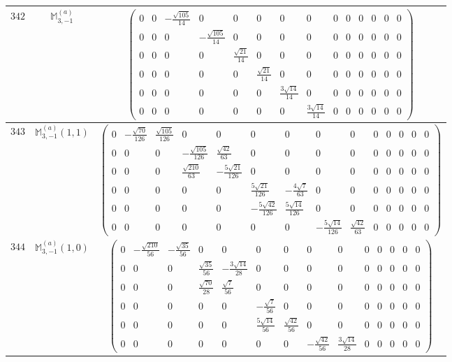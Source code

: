 \documentclass[fleqn,8pt,landscape]{jsarticle}
\begin{document}
\begin{center}
\begin{longtable}{ccc}
$ 342 $ & $ \mathbb{M}_{3,-1}^{(a)} $ & $ \begin{pmatrix} 0 & 0 & - \frac{\sqrt{105}}{14} & 0 & 0 & 0 & 0 & 0 & 0 & 0 & 0 & 0 & 0 & 0 \\ 0 & 0 & 0 & - \frac{\sqrt{105}}{14} & 0 & 0 & 0 & 0 & 0 & 0 & 0 & 0 & 0 & 0 \\ 0 & 0 & 0 & 0 & \frac{\sqrt{21}}{14} & 0 & 0 & 0 & 0 & 0 & 0 & 0 & 0 & 0 \\ 0 & 0 & 0 & 0 & 0 & \frac{\sqrt{21}}{14} & 0 & 0 & 0 & 0 & 0 & 0 & 0 & 0 \\ 0 & 0 & 0 & 0 & 0 & 0 & \frac{3 \sqrt{14}}{14} & 0 & 0 & 0 & 0 & 0 & 0 & 0 \\ 0 & 0 & 0 & 0 & 0 & 0 & 0 & \frac{3 \sqrt{14}}{14} & 0 & 0 & 0 & 0 & 0 & 0 \end{pmatrix} $ \\ \hline
$ 343 $ & $ \mathbb{M}_{3,-1}^{(a)}(1,1) $ & $ \begin{pmatrix} 0 & - \frac{\sqrt{70}}{126} & \frac{\sqrt{105}}{126} & 0 & 0 & 0 & 0 & 0 & 0 & 0 & 0 & 0 & 0 & 0 \\ 0 & 0 & 0 & - \frac{\sqrt{105}}{126} & \frac{\sqrt{42}}{63} & 0 & 0 & 0 & 0 & 0 & 0 & 0 & 0 & 0 \\ 0 & 0 & 0 & \frac{\sqrt{210}}{63} & - \frac{5 \sqrt{21}}{126} & 0 & 0 & 0 & 0 & 0 & 0 & 0 & 0 & 0 \\ 0 & 0 & 0 & 0 & 0 & \frac{5 \sqrt{21}}{126} & - \frac{4 \sqrt{7}}{63} & 0 & 0 & 0 & 0 & 0 & 0 & 0 \\ 0 & 0 & 0 & 0 & 0 & - \frac{5 \sqrt{42}}{126} & \frac{5 \sqrt{14}}{126} & 0 & 0 & 0 & 0 & 0 & 0 & 0 \\ 0 & 0 & 0 & 0 & 0 & 0 & 0 & - \frac{5 \sqrt{14}}{126} & \frac{\sqrt{42}}{63} & 0 & 0 & 0 & 0 & 0 \end{pmatrix} $ \\ \hline
$ 344 $ & $ \mathbb{M}_{3,-1}^{(a)}(1,0) $ & $ \begin{pmatrix} 0 & - \frac{\sqrt{210}}{56} & - \frac{\sqrt{35}}{56} & 0 & 0 & 0 & 0 & 0 & 0 & 0 & 0 & 0 & 0 & 0 \\ 0 & 0 & 0 & \frac{\sqrt{35}}{56} & - \frac{3 \sqrt{14}}{28} & 0 & 0 & 0 & 0 & 0 & 0 & 0 & 0 & 0 \\ 0 & 0 & 0 & \frac{\sqrt{70}}{28} & \frac{\sqrt{7}}{56} & 0 & 0 & 0 & 0 & 0 & 0 & 0 & 0 & 0 \\ 0 & 0 & 0 & 0 & 0 & - \frac{\sqrt{7}}{56} & 0 & 0 & 0 & 0 & 0 & 0 & 0 & 0 \\ 0 & 0 & 0 & 0 & 0 & \frac{5 \sqrt{14}}{56} & \frac{\sqrt{42}}{56} & 0 & 0 & 0 & 0 & 0 & 0 & 0 \\ 0 & 0 & 0 & 0 & 0 & 0 & 0 & - \frac{\sqrt{42}}{56} & \frac{3 \sqrt{14}}{28} & 0 & 0 & 0 & 0 & 0 \end{pmatrix} $ \\ \hline

\end{longtable}
\end{center}
\end{document}
